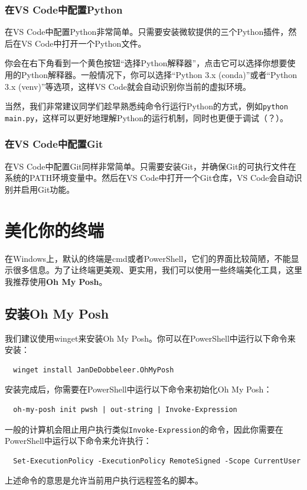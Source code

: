 \documentclass[../main.tex]{subfiles}
\begin{document}
\subsubsection{在VS Code中配置Python}

在VS Code中配置Python非常简单。只需要安装微软提供的三个Python插件，然后在VS Code中打开一个Python文件。

你会在右下角看到一个黄色按钮“选择Python解释器”，点击它可以选择你想要使用的Python解释器。一般情况下，你可以选择“Python 3.x (conda)”或者“Python 3.x (venv)”等选项，这样VS Code就会自动识别你当前的虚拟环境。

当然，我们非常建议同学们趁早熟悉纯命令行运行Python的方式，例如\texttt{python main.py}，这样可以更好地理解Python的运行机制，同时也更便于调试（？）。

\subsubsection{在VS Code中配置Git}

在VS Code中配置Git同样非常简单。只需要安装Git，并确保Git的可执行文件在系统的PATH环境变量中。然后在VS Code中打开一个Git仓库，VS Code会自动识别并启用Git功能。

\section{美化你的终端}

在Windows上，默认的终端是cmd或者PowerShell，它们的界面比较简陋，不能显示很多信息。为了让终端更美观、更实用，我们可以使用一些终端美化工具，这里我推荐使用\textbf{Oh My Posh}。

\subsection{安装Oh My Posh}

我们建议使用winget来安装Oh My Posh。你可以在PowerShell中运行以下命令来安装：

\begin{verbatim}
  winget install JanDeDobbeleer.OhMyPosh
\end{verbatim}

安装完成后，你需要在PowerShell中运行以下命令来初始化Oh My Posh：
\begin{verbatim}
  oh-my-posh init pwsh | out-string | Invoke-Expression
\end{verbatim}

一般的计算机会阻止用户执行类似\texttt{Invoke-Expression}的命令，因此你需要在PowerShell中运行以下命令来允许执行：
\begin{verbatim}
  Set-ExecutionPolicy -ExecutionPolicy RemoteSigned -Scope CurrentUser
\end{verbatim}
上述命令的意思是允许当前用户执行远程签名的脚本。
\end{document}
